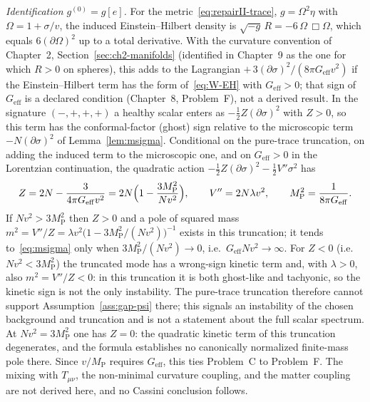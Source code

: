 \emph{Identification \(g^{(0)}=g[e]\).}
For the metric~\eqref{eq:repairII-trace}, \(g=\Omega^{2}\eta\) with
\(\Omega=1+\sigma/v\), the induced Einstein--Hilbert density is
\(\sqrt{-g}\,R=-6\,\Omega\,\Box\Omega\), which equals
\(6(\partial\Omega)^{2}\) up to a total derivative. With the curvature
convention of Chapter~2, Section~\ref{sec:ch2-manifolds} (identified in
Chapter~9 as the one for which \(R>0\) on spheres), this adds to the
Lagrangian \(+\,3(\partial\sigma)^2/(8\pi G_{\mathrm{eff}}v^{2})\)
if the Einstein--Hilbert term has the form of~\eqref{eq:W-EH} with
\(G_{\mathrm{eff}}>0\); that sign of \(G_{\mathrm{eff}}\) is a declared
condition (Chapter~8, Problem~F), not a derived result. In the signature
\((-,+,+,+)\) a healthy scalar enters as
\(-\tfrac12 Z(\partial\sigma)^2\) with \(Z>0\), so this term has the
conformal-factor (ghost) sign relative to the microscopic term
\(-N(\partial\sigma)^2\) of Lemma~\ref{lem:msigma}. Conditional on the
pure-trace truncation, on adding the induced term to the microscopic one,
and on \(G_{\mathrm{eff}}>0\) in the Lorentzian continuation, the quadratic
action
\(-\tfrac12 Z(\partial\sigma)^2-\tfrac12 V''\sigma^2\) has
\begin{equation}
  \label{eq:Z-sigma}
  Z=2N-\frac{3}{4\pi G_{\mathrm{eff}}v^{2}}
   =2N\Bigl(1-\frac{3M_{\mathrm P}^{2}}{Nv^{2}}\Bigr),
  \qquad
  V''=2N\lambda v^{2},
  \qquad
  M_{\mathrm P}^{2}=\frac1{8\pi G_{\mathrm{eff}}}.
\end{equation}
If \(Nv^{2}>3M_{\mathrm P}^{2}\) then \(Z>0\) and a pole of squared mass
\(m^{2}=V''/Z=\lambda v^{2}\bigl(1-3M_{\mathrm P}^{2}/(Nv^{2})\bigr)^{-1}\)
exists in this truncation; it tends to~\eqref{eq:msigma} only when
\(3M_{\mathrm P}^{2}/(Nv^{2})\to0\), i.e.\
\(G_{\mathrm{eff}}Nv^{2}\to\infty\). For \(Z<0\) (i.e.\
\(Nv^{2}<3M_{\mathrm P}^{2}\)) the truncated mode has a wrong-sign kinetic
term and, with \(\lambda>0\), also \(m^{2}=V''/Z<0\): in this truncation it
is both ghost-like and tachyonic, so the kinetic sign is not the only
instability. The pure-trace truncation therefore cannot support
Assumption~\ref{ass:gap-psi} there; this signals an instability of the
chosen background and truncation and is not a statement about the full
scalar spectrum. At \(Nv^{2}=3M_{\mathrm P}^{2}\) one has \(Z=0\): the
quadratic kinetic term of this truncation degenerates, and the formula
establishes no canonically normalized finite-mass pole there. Since
\(v/M_{\mathrm P}\) requires \(G_{\mathrm{eff}}\), this ties Problem~C to
Problem~F. The mixing with \(T_{\mu\nu}\), the non-minimal curvature
coupling, and the matter coupling are not derived here, and no Cassini
conclusion follows.

